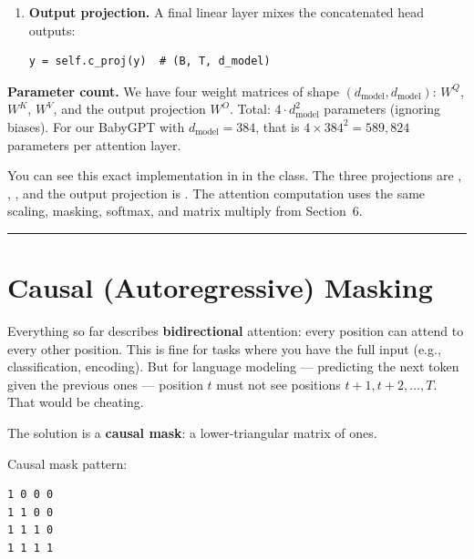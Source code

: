 \begin{enumerate}

  \item \textbf{Output projection.} A final linear layer mixes the concatenated head outputs:

\begin{lstlisting}
y = self.c_proj(y)  # (B, T, d_model)
\end{lstlisting}
\end{enumerate}

\textbf{Parameter count.} We have four weight matrices of shape $(d_{\text{model}}, d_{\text{model}})$: $W^Q$, $W^K$, $W^V$, and the output projection $W^O$. Total: $4 \cdot d_{\text{model}}^2$ parameters (ignoring biases). For our BabyGPT with $d_{\text{model}} = 384$, that is $4 \times 384^2 = 589{,}824$ parameters per attention layer.

You can see this exact implementation in  in the  class. The three projections are , , , and the output projection is . The attention computation uses the same scaling, masking, softmax, and matrix multiply from Section~6.

\bigskip\hrule\bigskip

\section{Causal (Autoregressive) Masking}

Everything so far describes \textbf{bidirectional} attention: every position can attend to every other position. This is fine for tasks where you have the full input (e.g., classification, encoding). But for language modeling --- predicting the next token given the previous ones --- position $t$ must not see positions $t+1, t+2, \ldots, T$. That would be cheating.

The solution is a \textbf{causal mask}: a lower-triangular matrix of ones.

Causal mask pattern:

\outputtag
\begin{lstlisting}[language={}]
1 0 0 0
1 1 0 0
1 1 1 0
1 1 1 1
\end{lstlisting}

